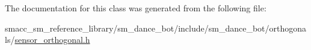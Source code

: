 The documentation for this class was generated from the following file\+:\begin{DoxyCompactItemize}
\item 
smacc\+\_\+sm\+\_\+reference\+\_\+library/sm\+\_\+dance\+\_\+bot/include/sm\+\_\+dance\+\_\+bot/orthogonals/\hyperlink{sensor__orthogonal_8h}{sensor\+\_\+orthogonal.\+h}\end{DoxyCompactItemize}
